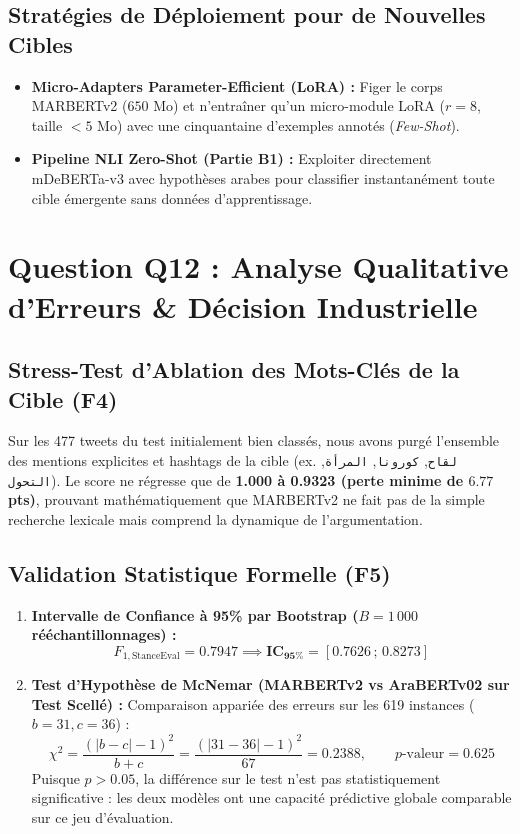 \documentclass[11pt,a4paper]{article}
\begin{document}
\subsection{Stratégies de Déploiement pour de Nouvelles Cibles}
\begin{itemize}
    \item \textbf{Micro-Adapters Parameter-Efficient (LoRA) :} Figer le corps MARBERTv2 ($650$ Mo) et n'entraîner qu'un micro-module LoRA ($r=8$, taille $<5$ Mo) avec une cinquantaine d'exemples annotés (\textit{Few-Shot}).
    \item \textbf{Pipeline NLI Zero-Shot (Partie B1) :} Exploiter directement mDeBERTa-v3 avec hypothèses arabes pour classifier instantanément toute cible émergente sans données d'apprentissage.
\end{itemize}

\section{Question Q12 : Analyse Qualitative d'Erreurs \& Décision Industrielle}

\subsection{Stress-Test d'Ablation des Mots-Clés de la Cible (F4)}
Sur les 477 tweets du test initialement bien classés, nous avons purgé l'ensemble des mentions explicites et hashtags de la cible (ex. \texttt{لقاح}, \texttt{كورونا}, \texttt{المرأة}, \texttt{التحول}). Le score ne régresse que de \textbf{1.000 à 0.9323 (perte minime de $6.77$ pts)}, prouvant mathématiquement que MARBERTv2 ne fait pas de la simple recherche lexicale mais comprend la dynamique de l'argumentation.

\subsection{Validation Statistique Formelle (F5)}
\begin{enumerate}
    \item \textbf{Intervalle de Confiance à 95\% par Bootstrap ($B = 1\,000$ rééchantillonnages) :}
    \begin{equation}
        F_{1,\text{StanceEval}} = 0.7947 \implies \mathbf{\text{IC}_{95\%} = [0.7626 \,;\, 0.8273]}
    \end{equation}
    \item \textbf{Test d'Hypothèse de McNemar (MARBERTv2 vs AraBERTv02 sur Test Scellé) :}
    Comparaison appariée des erreurs sur les 619 instances ($b=31, c=36$) :
    \begin{equation}
        \chi^2 = \frac{(|b - c| - 1)^2}{b + c} = \frac{(|31 - 36| - 1)^2}{67} = \mathbf{0.2388}, \qquad p\text{-valeur} = \mathbf{0.625}
    \end{equation}
    Puisque $p > 0.05$, la différence sur le test n'est pas statistiquement significative : les deux modèles ont une capacité prédictive globale comparable sur ce jeu d'évaluation.
\end{enumerate}
\end{document}
